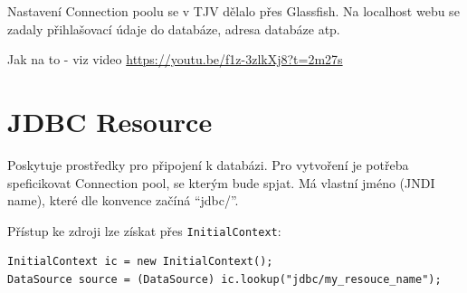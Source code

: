 \documentclass{szzclass}
\begin{document}
Nastavení Connection poolu se v TJV dělalo přes Glassfish. Na localhost webu se zadaly přihlašovací údaje do databáze, adresa databáze atp.

Jak na to - viz video \url{https://youtu.be/f1z-3zlkXj8?t=2m27s }

\section{JDBC Resource}
Poskytuje prostředky pro připojení k databázi. Pro vytvoření je potřeba speficikovat Connection pool, se kterým bude spjat. Má vlastní jméno (JNDI name), které dle konvence začíná “jdbc/”.

Přístup ke zdroji lze získat přes \texttt{InitialContext}:

\begin{verbatim}
InitialContext ic = new InitialContext();
DataSource source = (DataSource) ic.lookup("jdbc/my_resouce_name");
\end{verbatim}
\end{document}
